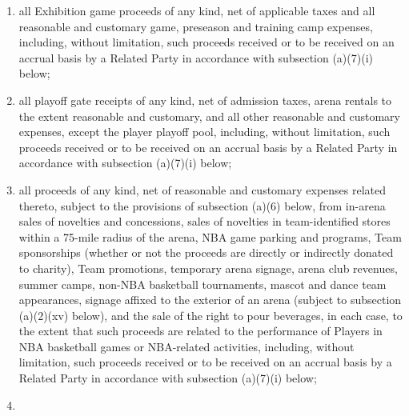 \documentclass[
]{book}
\begin{document}
\begin{enumerate}
\begin{enumerate}
\begin{enumerate}
    \item
      all Exhibition game proceeds of any kind, net of applicable taxes and all reasonable and customary game, preseason and training camp expenses, including, without limitation, such proceeds received or to be received on an accrual basis by a Related Party in accordance with subsection (a)(7)(i) below;
    \item
      all playoff gate receipts of any kind, net of admission taxes, arena rentals to the extent reasonable and customary, and all other reasonable and customary expenses, except the player playoff pool, including, without limitation, such proceeds received or to be received on an accrual basis by a Related Party in accordance with subsection (a)(7)(i) below;
    \item
      all proceeds of any kind, net of reasonable and customary expenses related thereto, subject to the provisions of subsection (a)(6) below, from in-arena sales of novelties and concessions, sales of novelties in team-identified stores within a 75-mile radius of the arena, NBA game parking and programs, Team sponsorships (whether or not the proceeds are directly or indirectly donated to charity), Team promotions, temporary arena signage, arena club revenues, summer camps, non-NBA basketball tournaments, mascot and dance team appearances, signage affixed to the exterior of an arena (subject to subsection (a)(2)(xv) below), and the sale of the right to pour beverages, in each case, to the extent that such proceeds are related to the performance of Players in NBA basketball games or NBA-related activities, including, without limitation, such proceeds received or to be received on an accrual basis by a Related Party in accordance with subsection (a)(7)(i) below;
    \item

\end{enumerate}
\end{enumerate}
\end{enumerate}
\end{document}
